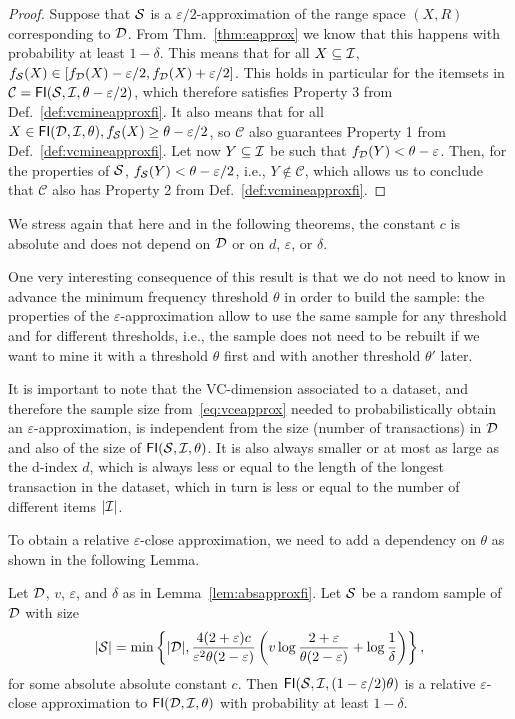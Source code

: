 \begin{proof}
  Suppose that ${\cal S}$ is a $\varepsilon/2$-approximation of the range space $(X,R)$ corresponding
  to ${\cal D}$. From Thm.~\ref{thm:eapprox} we know that this happens with probability at least $1-\delta$.  
  This means that for all $X\subseteq{\cal I}$,
  $f_{\cal S}(X)\in[f_{\cal D}(X)-\varepsilon/2,f_{\cal D}(X)+\varepsilon/2]$.
  This holds in particular for the itemsets in
  $\mathcal{C}=\mathsf{FI}({\cal S},{\cal I},\theta-\varepsilon/2)$, which therefore satisfies
  Property 3 from Def.~\ref{def:vcmineapproxfi}. It also means that for all $X\in\mathsf{FI}({\cal D},{\cal I},\theta),
  f_{\cal S}(X)\ge \theta-\varepsilon/2$, so $\mathcal{C}$ also guarantees Property
  1 from Def.~\ref{def:vcmineapproxfi}. Let now $Y\subseteq{\cal I}$ be such that
  $f_{\cal D}(Y)< \theta-\varepsilon$. Then, for the properties of ${\cal S}$,
  $f_{\cal S}(Y)<\theta-\varepsilon/2$, i.e., $Y\notin \mathcal{C}$, which allows us
  to conclude that $\mathcal{C}$ also has Property 2 from Def.~\ref{def:vcmineapproxfi}.
\end{proof}

We stress again that here and in the following theorems, the constant $c$ is
absolute and does not depend on ${\cal D}$ or on $d$, $\varepsilon$, or $\delta$.

One very interesting consequence of this result is that we do not need to know
in advance the minimum frequency threshold $\theta$ in order to build the
sample: the properties of the $\varepsilon$-approximation allow to use the same
sample for any threshold and for different thresholds, i.e., the sample does not
need to be rebuilt if we want to mine it with a threshold $\theta$ first and
with another threshold $\theta'$ later.

It is important to note that the VC-dimension associated to a dataset, and
therefore the sample size from~\eqref{eq:vceapprox} needed to probabilistically
obtain an $\varepsilon$-approximation, is independent from the size (number of
transactions) in ${\cal D}$ and also of the size of $\mathsf{FI}({\cal S},{\cal I},\theta)$. It is
also always smaller or at most as large as the d-index $d$, which is always less
or equal to the length of the longest transaction in the dataset, which in turn
is less or equal to the number of different items $|{\cal I}|$.

To obtain a relative $\varepsilon$-close approximation, we
need to add a dependency on $\theta$ as shown in the following Lemma.

\begin{lemma}\label{lem:relapproxfi}
  Let ${\cal D}$, $v$, $\varepsilon$, and $\delta$ as in Lemma~\ref{lem:absapproxfi}. Let
  ${\cal S}$ be a random sample of ${\cal D}$ with size 
  \[
  |{\cal S}| =
  \min\left\{|{\cal D}|,\frac{4(2+\varepsilon)c}{\varepsilon^2\theta(2-\varepsilon)}\left(v\log\frac{2+\varepsilon}{\theta(2-\varepsilon)}+\log\frac{1}{\delta}\right)\right\},\]
  for some absolute absolute constant $c$. Then $\mathsf{FI}({\cal S},{\cal I},(1-\varepsilon/2)\theta)$ is a relative
  $\varepsilon$-close approximation to $\mathsf{FI}({\cal D},{\cal I},\theta)$ with probability
  at least $1-\delta$.
\end{lemma}

